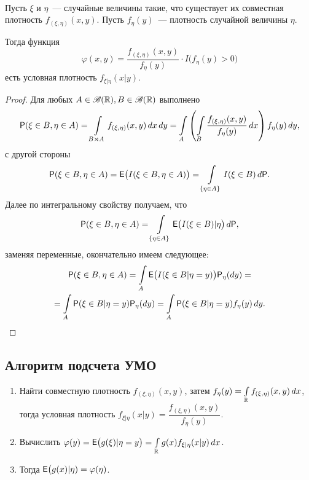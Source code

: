  \begin{theorem}~
 
 	Пусть $\xi$ и $\eta$~--- случайные величины такие, что существует их совместная плотность $f_{(\xi, \eta)} (x, y)$. Пусть $f_\eta (y)$~--- плотность случайной величины $\eta$.
 	
 	Тогда функция $$\varphi(x, y) = \dfrac{f_{(\xi, \eta)} (x, y)}{f_\eta (y)} \cdot I \big(f_\eta(y) > 0 \big)$$ есть условная плотность $f_{\xi |\eta} (x | y)$.
 	\begin{proof}
 		Для любых $A \in \B(\R), B \in \B(\R)$ выполнено
 		\begin{multline*}
 			\P(\xi \in B, \eta \in A) = 
 			\int\limits_{B \rtimes A} f_{(\xi, \eta)} (x, y) \, dx \, dy = 
 			\int\limits_A \left( \int\limits_B \dfrac{f_{(\xi, \eta)} 
 			(x, y)}{f_\eta(y)} \, dx \right) f_\eta(y) \, dy,
 		\end{multline*}
 		с другой стороны
 		\begin{equation*}
 			\P( \xi \in B, \eta \in A) = \E \big( I (\xi \in B, \eta \in A) \big) = 
 			\int\limits_{\{\eta \in A \}} I(\xi \in B) \, d\P.
 		\end{equation*}
 		Далее по интегральному свойству получаем, что
 		\begin{equation*}
 			\P( \xi \in B, \eta \in A) = 
 			\int\limits_{\{\eta \in A \}} \E  \big( I(\xi \in B) | \eta \big) \, d\P,
 		\end{equation*}
 		заменяя переменные, окончательно имеем следующее:
 		\begin{multline*}
 			\P( \xi \in B, \eta \in A) = 
 			\int\limits_A \E \big( I (\xi \in B | \eta = y) \big) \P_\eta(d y) =\\ 
 			= \int\limits_A \P(\xi \in B | \eta = y) \P_\eta(dy) = 
 			\int\limits_A \P( \xi \in B | \eta = y) f_\eta (y) \, dy.
 		\end{multline*}
 	\end{proof}
 \end{theorem}
 
 \subsection{Алгоритм подсчета УМО}
 \begin{enumerate}
 	\item {Найти совместную плотность $f_{(\xi, \eta)} (x, y)$, затем 
 		$f_\eta (y) = \int\limits_\R f_{(\xi, \eta)} (x, y) \, dx$, тогда условная плотность $f_{ \xi | \eta } (x | y) = \dfrac{f_{(\xi, \eta)} (x, y)}{f_\eta (y)}$.}
 	\item {Вычислить $\varphi(y) = \E \big( g(\xi) | \eta = y \big) = \int\limits_\R g(x) f_{ \xi | \eta } (x | y) \, dx $.}
 	\item {Тогда $\E  \big( g(x) | \eta) = \varphi(\eta)$.}
 \end{enumerate}
 